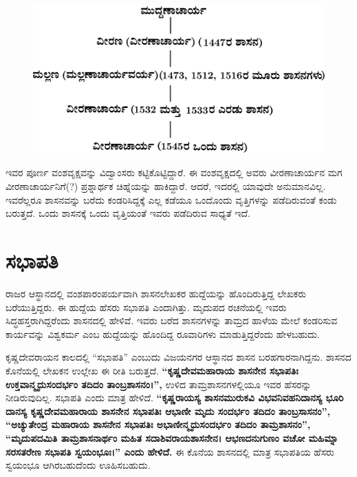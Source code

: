 \newpage

\begin{figure}[H]
\includegraphics{images/chap5/chap5fig5.jpeg}
\end{figure}

ಇವರ ಪೂರ್ಣ ವಂಶವೃಕ್ಷವನ್ನು ವಿದ್ವಾಂಸರು ಕಟ್ಟಿಕೊಟ್ಟಿದ್ದಾರೆ. ಈ ವಂಶವೃಕ್ಷದಲ್ಲಿ ಅವರು ವೀರಣಾಚಾರ್ಯನ ಮಗ ವೀರಣಾಚಾರ್ಯನಿಗೆ(?) ಪ್ರಶ್ನಾರ್ಥಕ ಚಿಹ್ನೆಯನ್ನು ಹಾಕಿದ್ದಾರೆ. ಆದರೆ, ಇದರಲ್ಲಿ ಯಾವುದೇ ಅನುಮಾನವಿಲ್ಲ. ಇವರೆಲ್ಲರೂ ಶಾಸನವನ್ನು ಬರೆದು ಕಂಡರಿಸಿದ್ದಕ್ಕೆ ಎಲ್ಲ ಕಡೆಯೂ ಒಂದೊಂದು ವೃತ್ತಿಗಳನ್ನು ಪಡೆದಿರುವಂತೆ ಕಂಡು ಬರುತ್ತದೆ. ಒಂದು ಶಾಸನಕ್ಕೆ ಒಂದು ವೃತ್ತಿಯಂತೆ ಇವರು ಪಡೆದಿರುವ ಸಾಧ್ಯತೆ ಇದೆ.


\section*{ಸಭಾಪತಿ}

ರಾಜರ ಆಸ್ಥಾನದಲ್ಲಿ ವಂಶಪಾರಂಪರ್ಯವಾಗಿ ಶಾಸನಲೇಖಕರ ಹುದ್ದೆಯನ್ನು ಹೊಂದಿರುತ್ತಿದ್ದ ಲೇಖಕರು ಬರೆಯುತ್ತಿದ್ದರು. ಈ ಹುದ್ದೆಯ ಹೆಸರು ಸಭಾಪತಿ ಎಂದಾಗಿತ್ತು. ಮೃದುಪದ ರಚನೆಯಲ್ಲಿ ಇವರು ಸಿದ್ಧಹಸ್ತರಾಗಿದ್ದರೆಂದು ಶಾಸನದಲ್ಲಿ ಹೇಳಿವೆ. ಇವರು ಬರೆದ ಶಾಸನಗಳನ್ನು ತಾಮ್ರದ ಹಾಳೆಯ ಮೇಲೆ ಕಂಡರಿಸುವ ಕಾರ್ಯವನ್ನು ವಿಶ್ವಕರ್ಮ ಎಂಬ ಹುದ್ದೆಯನ್ನು ಹೊಂದಿದ್ದ ರೂವಾರಿಗಳು ಮಾಡುತ್ತಿದ್ದರೆಂದು ಹೇಳಬಹುದು.

ಕೃಷ್ಣದೇವರಾಯನ ಕಾಲದಲ್ಲಿ “ಸಭಾಪತಿ” ಎಂಬುದು ವಿಜಯನಗರ ಆಸ್ಥಾನದ ಶಾಸನ ಬರಹಗಾರನಾಗಿದ್ದನು. ಶಾಸನದ ಕೊನೆಯಲ್ಲಿ ಲೇಖಕನ ಉಲ್ಲೇಖ ಈ ರೀತಿ ಬರುತ್ತದೆ. \textbf{“ಕೃಷ್ಣದೇವಮಹಾರಾಯ ಶಾಸನೇನ ಸಭಾಪತಿಃ ಉಕ್ತವಾನ್ಮೃದುಸಂದರ್ಭಂ ತದಿದಂ ತಾಂಬ್ರಶಾಸನಂ।”,} ಉಳಿದ ತಾಮ್ರಶಾಸನಗಳಲ್ಲಿಯೂ ಇವರ ಹೆಸರನ್ನು ನೀಡಿರುವುದಿಲ್ಲ. ಸಭಾಪತಿ ಎಂದು ಮಾತ್ರ ಹೇಳಿದೆ. \textbf{“ಕೃಷ್ಣರಾಯಸ್ಯ ಶಾಸನಮುರುಕವಿ ವಿಭವನಿವಹನಿದಾನಸ್ಯ ಭೂರಿ ದಾನಸ್ಯ ಕೃಷ್ಣದೇವಮಹಾರಾಯ ಶಾಸನೇನ ಸಭಾಪತಿಃ ಆಭಾಣೀ ಮೃದು ಸಂದರ್ಭಂ ತದಿದಂ ತಾಂಬ್ರಸಾಸನಂ”, “ಅಚ್ಯುತೇಂದ್ರ ಮಹಾರಾಯ ಶಾಸನೇನ ಸಭಾಪತಿಃ ಅಭಾಣೀನ್ಮೃದುಸಂದರ್ಭಂ ತದಿದಂ ತಾಮ್ರಶಾಸನಂ”, “ಮೃದುಪದಮಿತಿ ತಾಮ್ರಶಾಸನಾರ್ಥಂ ಮಹಿತ ಸದಾಶಿವ\-ರಾಯಶಾಸನೇನ। ಆಭಣದನುಗುಣಂ ವಚೋ ಮಹಿಮ್ನಾ ಸರಸತರೇಣ ಸಭಾಪತಿ ಸ್ವಯಂಭೂಃ।” ಎಂದು ಹೇಳಿದೆ. }ಈ ಕೊನೆಯ ಶಾಸನದಲ್ಲಿ ಮಾತ್ರ ಸಭಾಪತಿಯ ಹೆಸರು ಸ್ವಯಂಭೂ ಆಗಿರಬಹುದೆಂದು ಊಹಿಸಬಹುದು.

